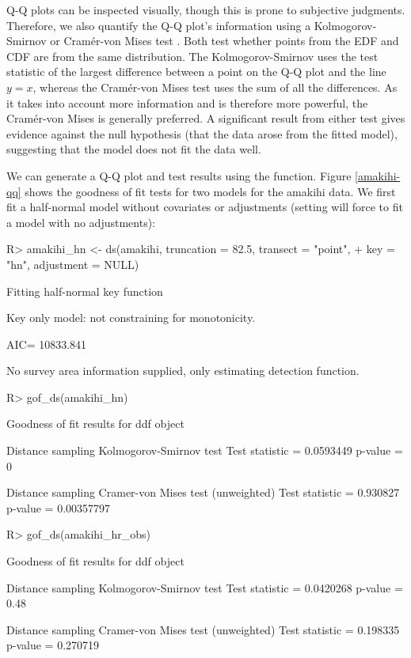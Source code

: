 \documentclass[article]{jss}\usepackage[]{graphicx}\usepackage[]{color}
\begin{document}
Q-Q plots can be inspected visually, though this is prone to subjective judgments. Therefore, we also quantify the Q-Q plot's information using a Kolmogorov-Smirnov or Cram\'{e}r-von Mises test \citep{Burnham:2004vd}. Both test whether points from the EDF and CDF are from the same distribution. The Kolmogorov-Smirnov uses the test statistic of the largest difference between a point on the Q-Q plot and the line $y=x$, whereas the Cram\'{e}r-von Mises test uses the sum of all the differences. As it takes into account more information and is therefore more powerful, the Cram\'{e}r-von Mises is generally preferred. A significant result from either test gives evidence against the null hypothesis (that the data arose from the fitted model), suggesting that the model does not fit the data well. 

We can generate a Q-Q plot and test results using the  function. Figure \ref{amakihi-qq} shows the goodness of fit tests for two models for the amakihi data. We first fit a half-normal model without covariates or adjustments (setting  will force  to fit a model with no adjustments):
\begin{Schunk}
\begin{Sinput}
R> amakihi_hn <- ds(amakihi, truncation = 82.5, transect = "point",
+                  key = "hn", adjustment = NULL)
\end{Sinput}
\begin{Soutput}
Fitting half-normal key function
\end{Soutput}
\begin{Soutput}
Key only model: not constraining for monotonicity.
\end{Soutput}
\begin{Soutput}
AIC= 10833.841
\end{Soutput}
\begin{Soutput}
No survey area information supplied, only estimating detection function.
\end{Soutput}
\begin{Sinput}
R> gof_ds(amakihi_hn)
\end{Sinput}
\begin{Soutput}

Goodness of fit results for ddf object

Distance sampling Kolmogorov-Smirnov test
Test statistic = 0.0593449 p-value = 0

Distance sampling Cramer-von Mises test (unweighted)
Test statistic = 0.930827 p-value = 0.00357797
\end{Soutput}
\begin{Sinput}
R> gof_ds(amakihi_hr_obs)
\end{Sinput}
\begin{Soutput}

Goodness of fit results for ddf object

Distance sampling Kolmogorov-Smirnov test
Test statistic = 0.0420268 p-value = 0.48

Distance sampling Cramer-von Mises test (unweighted)
Test statistic = 0.198335 p-value = 0.270719
\end{Soutput}
\end{Schunk}
\end{document}
